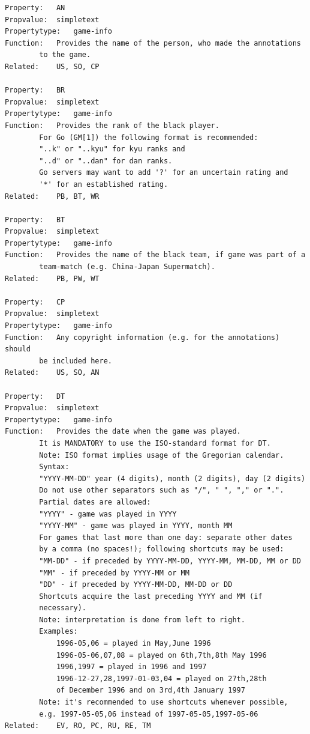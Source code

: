 \begin{verbatim}
Property:   AN
Propvalue:  simpletext
Propertytype:   game-info
Function:   Provides the name of the person, who made the annotations
        to the game.
Related:    US, SO, CP

Property:   BR
Propvalue:  simpletext
Propertytype:   game-info
Function:   Provides the rank of the black player.
        For Go (GM[1]) the following format is recommended:
        "..k" or "..kyu" for kyu ranks and
        "..d" or "..dan" for dan ranks.
        Go servers may want to add '?' for an uncertain rating and
        '*' for an established rating.
Related:    PB, BT, WR

Property:   BT
Propvalue:  simpletext
Propertytype:   game-info
Function:   Provides the name of the black team, if game was part of a
        team-match (e.g. China-Japan Supermatch).
Related:    PB, PW, WT

Property:   CP
Propvalue:  simpletext
Propertytype:   game-info
Function:   Any copyright information (e.g. for the annotations) should
        be included here.
Related:    US, SO, AN

Property:   DT
Propvalue:  simpletext
Propertytype:   game-info
Function:   Provides the date when the game was played.
        It is MANDATORY to use the ISO-standard format for DT.
        Note: ISO format implies usage of the Gregorian calendar.
        Syntax:
        "YYYY-MM-DD" year (4 digits), month (2 digits), day (2 digits)
        Do not use other separators such as "/", " ", "," or ".".
        Partial dates are allowed:
        "YYYY" - game was played in YYYY
        "YYYY-MM" - game was played in YYYY, month MM
        For games that last more than one day: separate other dates
        by a comma (no spaces!); following shortcuts may be used:
        "MM-DD" - if preceded by YYYY-MM-DD, YYYY-MM, MM-DD, MM or DD
        "MM" - if preceded by YYYY-MM or MM
        "DD" - if preceded by YYYY-MM-DD, MM-DD or DD
        Shortcuts acquire the last preceding YYYY and MM (if
        necessary).
        Note: interpretation is done from left to right.
        Examples:
            1996-05,06 = played in May,June 1996
            1996-05-06,07,08 = played on 6th,7th,8th May 1996
            1996,1997 = played in 1996 and 1997
            1996-12-27,28,1997-01-03,04 = played on 27th,28th
            of December 1996 and on 3rd,4th January 1997
        Note: it's recommended to use shortcuts whenever possible,
        e.g. 1997-05-05,06 instead of 1997-05-05,1997-05-06
Related:    EV, RO, PC, RU, RE, TM


\end{verbatim}
